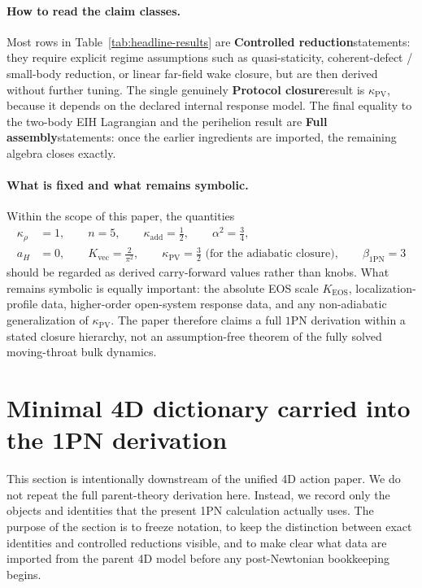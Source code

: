 \documentclass[11pt]{article}
\newcommand{\kadd}{\kappa_{\mathrm{add}}}
\newcommand{\kPV}{\kappa_{\mathrm{PV}}}
\newcommand{\krho}{\kappa_{\rho}}
\newcommand{\betaPN}{\beta_{\mathrm{1PN}}}
\newcommand{\Kvec}{K_{\mathrm{vec}}}
\newcommand{\KEOS}{K_{\mathrm{EOS}}}
\newcommand{\alphaSq}{\alpha^2}
\newcommand{\Controlled}{\textbf{Controlled reduction}}
\newcommand{\Protocol}{\textbf{Protocol closure}}
\newcommand{\FullMatch}{\textbf{Full assembly}}
\begin{document}
\paragraph{How to read the claim classes.}
Most rows in Table~\ref{tab:headline-results} are \Controlled statements: they require explicit regime assumptions such as quasi-staticity, coherent-defect / small-body reduction, or linear far-field wake closure, but are then derived without further tuning. The single genuinely \Protocol result is \(\kPV\), because it depends on the declared internal response model. The final equality to the two-body EIH Lagrangian and the perihelion result are \FullMatch statements: once the earlier ingredients are imported, the remaining algebra closes exactly.

\paragraph{What is fixed and what remains symbolic.}
Within the scope of this paper, the quantities
\[
\begin{aligned}
\krho &= 1, \qquad
n = 5, \qquad
\kadd = \frac12, \qquad
\alphaSq = \frac34, \\
a_H &= 0, \qquad
\Kvec = \frac{2}{\pi^2}, \qquad
\kPV = \frac32 \text{ (for the adiabatic closure)}, \qquad
\betaPN = 3
\end{aligned}
\]
should be regarded as derived carry-forward values rather than knobs. What remains symbolic is equally important: the absolute EOS scale \(\KEOS\), localization-profile data, higher-order open-system response data, and any non-adiabatic generalization of \(\kPV\). The paper therefore claims a full \(1\)PN derivation within a stated closure hierarchy, not an assumption-free theorem of the fully solved moving-throat bulk dynamics.

\section{Minimal 4D dictionary carried into the 1PN derivation}
\label{sec:dictionary}

This section is intentionally downstream of the unified 4D action paper. We do not
repeat the full parent-theory derivation here. Instead, we record only the objects and
identities that the present 1PN calculation actually uses. The purpose of the section is
to freeze notation, to keep the distinction between exact identities and controlled
reductions visible, and to make clear what data are imported from the parent 4D model
before any post-Newtonian bookkeeping begins.
\end{document}
